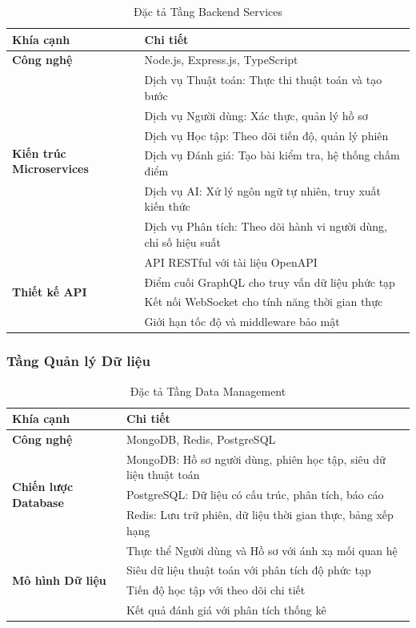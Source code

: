 \begin{table}[H]
\centering
\caption{Đặc tả Tầng Backend Services}
\label{tab:backend-services-specs}
\begin{tabular}{|p{3cm}|p{10cm}|}
\hline
\textbf{Khía cạnh} & \textbf{Chi tiết} \\
\hline
\textbf{Công nghệ} & Node.js, Express.js, TypeScript \\
\hline
\multirow{6}{3cm}{\textbf{Kiến trúc Microservices}} 
& Dịch vụ Thuật toán: Thực thi thuật toán và tạo bước \\
\cline{2-2}
& Dịch vụ Người dùng: Xác thực, quản lý hồ sơ \\
\cline{2-2}
& Dịch vụ Học tập: Theo dõi tiến độ, quản lý phiên \\
\cline{2-2}
& Dịch vụ Đánh giá: Tạo bài kiểm tra, hệ thống chấm điểm \\
\cline{2-2}
& Dịch vụ AI: Xử lý ngôn ngữ tự nhiên, truy xuất kiến thức \\
\cline{2-2}
& Dịch vụ Phân tích: Theo dõi hành vi người dùng, chỉ số hiệu suất \\
\hline
\multirow{4}{3cm}{\textbf{Thiết kế API}} 
& API RESTful với tài liệu OpenAPI \\
\cline{2-2}
& Điểm cuối GraphQL cho truy vấn dữ liệu phức tạp \\
\cline{2-2}
& Kết nối WebSocket cho tính năng thời gian thực \\
\cline{2-2}
& Giới hạn tốc độ và middleware bảo mật \\
\hline
\end{tabular}
\end{table}

\subsubsection{Tầng Quản lý Dữ liệu}

\begin{table}[H]
\centering
\caption{Đặc tả Tầng Data Management}
\label{tab:data-management-specs}
\begin{tabular}{|p{3cm}|p{10cm}|}
\hline
\textbf{Khía cạnh} & \textbf{Chi tiết} \\
\hline
\textbf{Công nghệ} & MongoDB, Redis, PostgreSQL \\
\hline
\multirow{3}{3cm}{\textbf{Chiến lược Database}} 
& MongoDB: Hồ sơ người dùng, phiên học tập, siêu dữ liệu thuật toán \\
\cline{2-2}
& PostgreSQL: Dữ liệu có cấu trúc, phân tích, báo cáo \\
\cline{2-2}
& Redis: Lưu trữ phiên, dữ liệu thời gian thực, bảng xếp hạng \\
\hline
\multirow{4}{3cm}{\textbf{Mô hình Dữ liệu}} 
& Thực thể Người dùng và Hồ sơ với ánh xạ mối quan hệ \\
\cline{2-2}
& Siêu dữ liệu thuật toán với phân tích độ phức tạp \\
\cline{2-2}
& Tiến độ học tập với theo dõi chi tiết \\
\cline{2-2}
& Kết quả đánh giá với phân tích thống kê \\
\hline
\end{tabular}
\end{table}

